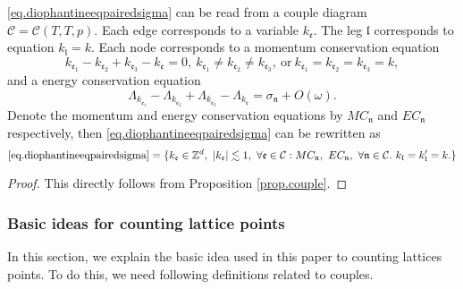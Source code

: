 \begin{prop}\label{prop.couple'}
\eqref{eq.diophantineeqpairedsigma} can be read from a couple diagram $\mathcal{C}=\mathcal{C}(T,T,p)$. Each edge corresponds to a variable $k_{\mathfrak{e}}$. The leg $\mathfrak{l}$ corresponds to equation $k_{\mathfrak{l}}=k$. Each node corresponds to a momentum conservation equation
\begin{equation}\label{eq.momentumconservationunit}
    k_{\mathfrak{e}_1}-k_{\mathfrak{e}_2}+k_{\mathfrak{e}_3}-k_{\mathfrak{e}}=0,\ k_{\mathfrak{e}_1}\ne k_{\mathfrak{e}_2}\ne k_{\mathfrak{e}_3},\ \text{or}\ k_{\mathfrak{e}_1}= k_{\mathfrak{e}_2}= k_{\mathfrak{e}_3}=k,
\end{equation} 
and a energy conservation equation 
\begin{equation}\label{eq.energyconservationunit}
    \Lambda_{k_{\mathfrak{e}_1}}-\Lambda_{k_{\mathfrak{e}_2}}+\Lambda_{k_{\mathfrak{e}_3}}-\Lambda_{k_{\mathfrak{e}}} =\sigma_{\mathfrak{n}}+O(\omega).
\end{equation}  
Denote the momentum and energy conservation equations by $MC_{\mathfrak{n}}$ and $EC_{\mathfrak{n}}$ respectively, then \eqref{eq.diophantineeqpairedsigma} can be rewritten as 
\begin{equation}\label{eq.diophantineeqpairedsigma'}
    \text{\eqref{eq.diophantineeqpairedsigma}}=\{k_{\mathfrak{e}}\in \mathbb{Z}^d,\ |k_{\mathfrak{e}}| \lesssim 1,\ \forall \mathfrak{e}\in \mathcal{C}:MC_{\mathfrak{n}},\  EC_{\mathfrak{n}},\ \forall \mathfrak{n}\in \mathcal{C}.\ k_{\mathfrak{l}}=k_{\mathfrak{l}}'=k.\}
\end{equation}
\end{prop}
\begin{proof}
This directly follows from Proposition \ref{prop.couple}. 
\end{proof}

\subsubsection{Basic ideas for counting lattice points} In this section, we explain the basic idea used in this paper to counting lattices points. To do this, we need following definitions related to couples.

